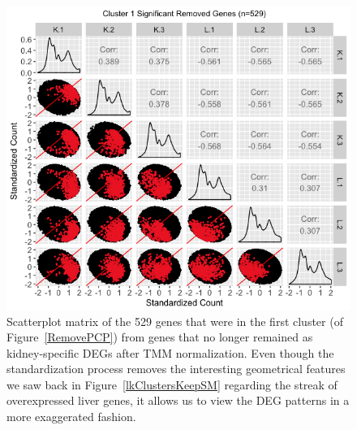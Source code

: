 \documentclass{article}
\begin{document}
\null
\begin{figure}[t!]
\centerline{\includegraphics[width=1\columnwidth]{../MakeFigures/lkClustersRemoveSM-St.jpg}}
\caption{Scatterplot matrix of the 529 genes that were in the first cluster (of Figure~\ref{RemovePCP}) from genes that no longer remained as kidney-specific DEGs after TMM normalization. Even though the standardization process removes the interesting geometrical features we saw back in Figure~\ref{lkClustersKeepSM} regarding the streak of overexpressed liver genes, it allows us to view the DEG patterns in a more exaggerated fashion.
\label{lkClustersRemoveSM-St}}
\end{figure}
\end{document}
